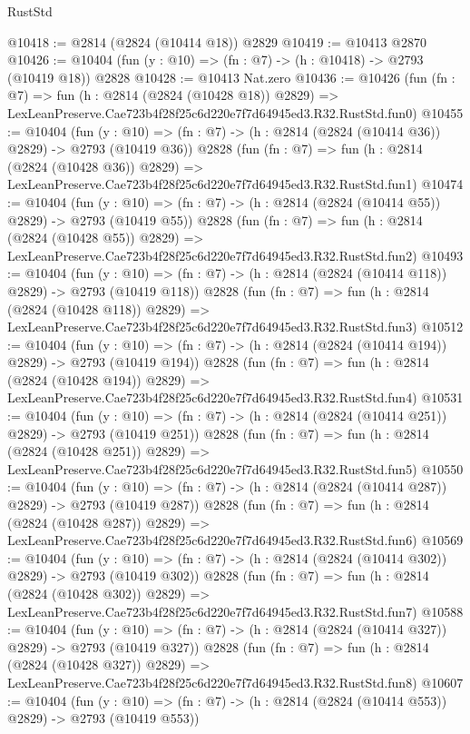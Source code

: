 \begin{lexlean}{RustStd}
\begin{coremodule}
@10418 := @2814 (@2824 (@10414 @18)) @2829
@10419 := @10413 @2870
@10426 := @10404 (fun (y : @10) => (fn : @7) -> (h : @10418) -> @2793 (@10419 @18)) @2828
@10428 := @10413 Nat.zero
@10436 := @10426
    (fun (fn : @7) =>
    fun (h : @2814 (@2824 (@10428 @18)) @2829) =>
    LexLeanPreserve.Cae723b4f28f25c6d220e7f7d64945ed3.R32.RustStd.fun0)
@10455 := @10404
    (fun (y : @10) => (fn : @7) -> (h : @2814 (@2824 (@10414 @36)) @2829) -> @2793 (@10419 @36))
    @2828
    (fun (fn : @7) =>
    fun (h : @2814 (@2824 (@10428 @36)) @2829) =>
    LexLeanPreserve.Cae723b4f28f25c6d220e7f7d64945ed3.R32.RustStd.fun1)
@10474 := @10404
    (fun (y : @10) => (fn : @7) -> (h : @2814 (@2824 (@10414 @55)) @2829) -> @2793 (@10419 @55))
    @2828
    (fun (fn : @7) =>
    fun (h : @2814 (@2824 (@10428 @55)) @2829) =>
    LexLeanPreserve.Cae723b4f28f25c6d220e7f7d64945ed3.R32.RustStd.fun2)
@10493 := @10404
    (fun (y : @10) => (fn : @7) -> (h : @2814 (@2824 (@10414 @118)) @2829) -> @2793 (@10419 @118))
    @2828
    (fun (fn : @7) =>
    fun (h : @2814 (@2824 (@10428 @118)) @2829) =>
    LexLeanPreserve.Cae723b4f28f25c6d220e7f7d64945ed3.R32.RustStd.fun3)
@10512 := @10404
    (fun (y : @10) => (fn : @7) -> (h : @2814 (@2824 (@10414 @194)) @2829) -> @2793 (@10419 @194))
    @2828
    (fun (fn : @7) =>
    fun (h : @2814 (@2824 (@10428 @194)) @2829) =>
    LexLeanPreserve.Cae723b4f28f25c6d220e7f7d64945ed3.R32.RustStd.fun4)
@10531 := @10404
    (fun (y : @10) => (fn : @7) -> (h : @2814 (@2824 (@10414 @251)) @2829) -> @2793 (@10419 @251))
    @2828
    (fun (fn : @7) =>
    fun (h : @2814 (@2824 (@10428 @251)) @2829) =>
    LexLeanPreserve.Cae723b4f28f25c6d220e7f7d64945ed3.R32.RustStd.fun5)
@10550 := @10404
    (fun (y : @10) => (fn : @7) -> (h : @2814 (@2824 (@10414 @287)) @2829) -> @2793 (@10419 @287))
    @2828
    (fun (fn : @7) =>
    fun (h : @2814 (@2824 (@10428 @287)) @2829) =>
    LexLeanPreserve.Cae723b4f28f25c6d220e7f7d64945ed3.R32.RustStd.fun6)
@10569 := @10404
    (fun (y : @10) => (fn : @7) -> (h : @2814 (@2824 (@10414 @302)) @2829) -> @2793 (@10419 @302))
    @2828
    (fun (fn : @7) =>
    fun (h : @2814 (@2824 (@10428 @302)) @2829) =>
    LexLeanPreserve.Cae723b4f28f25c6d220e7f7d64945ed3.R32.RustStd.fun7)
@10588 := @10404
    (fun (y : @10) => (fn : @7) -> (h : @2814 (@2824 (@10414 @327)) @2829) -> @2793 (@10419 @327))
    @2828
    (fun (fn : @7) =>
    fun (h : @2814 (@2824 (@10428 @327)) @2829) =>
    LexLeanPreserve.Cae723b4f28f25c6d220e7f7d64945ed3.R32.RustStd.fun8)
@10607 := @10404
    (fun (y : @10) => (fn : @7) -> (h : @2814 (@2824 (@10414 @553)) @2829) -> @2793 (@10419 @553))

\end{coremodule}
\end{lexlean}
